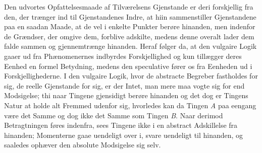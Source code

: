 \documentclass[12pt]{book}
\newcommand{\opage}[1]{\marginnote{\footnotesize\textit{[#1]}}}
\begin{document}
Den udvortes Opfattelsesmaade af Tilværelsens Gjenstande er deri
forskjellig fra den, der trænger ind til Gjenstandenes Indre, at hiin
sammenstiller Gjenstandene paa en
\opage{28} saadan Maade, at de vel i enkelte Punkter berøre hinanden, men
indenfor de Grændser, der omgive dem, forblive adskilte, medens denne
overalt lader dem falde sammen og gjennemtrænge hinanden. Heraf følger
da, at den vulgaire Logik gaaer ud fra Phænomenernes indbyrdes
Forskjellighed og kun tillægger deres Eenhed en formel Betydning,
medens den speculative fører os fra Eenheden ud i Forskjellighederne.
I den vulgaire Logik, hvor de abstracte Begreber fastholdes for sig,
de reelle Gjenstande for sig, er der Intet, man mere maa vogte sig for
end Modsigelse; thi naar Tingene gjensidigt berøre hinanden og det dog
er Tingens Natur at holde alt Fremmed udenfor sig, hvorledes kan da
Tingen \textit{A} paa eengang være det Samme og dog ikke det Samme som
Tingen \textit{B}. Naar derimod Betragtningen føres indenfra, sees
Tingene ikke i en abstract Adskillelse fra hinanden; Momenterne gaae
uendeligt over i, svare uendeligt til hinanden, og saaledes ophæver
den absolute Modsigelse sig selv.
\end{document}

